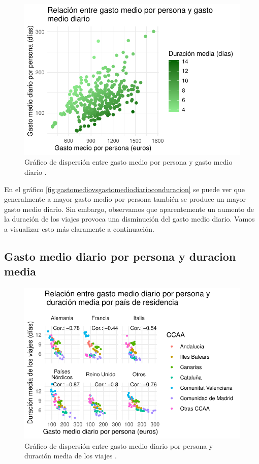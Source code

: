 \documentclass[data,article,submit,moreauthors,pdftex]{Definitions/mdpi}
\begin{document}
\begin{figure}[H]
\includegraphics{ProyectoAED2024_Rmd_files/figure-latex/unnamed-chunk-34-1} \caption{Gráfico de dispersión entre gasto medio por persona y gasto medio diario .\label{fig:gastomediovsgastomediodiarioconduracion}}\label{fig:unnamed-chunk-34}
\end{figure}

En el gráfico \ref{fig:gastomediovsgastomediodiarioconduracion} se puede
ver que generalmente a mayor gasto medio por persona también se produce
un mayor gasto medio diario. Sin embargo, observamos que aparentemente
un aumento de la duración de los viajes provoca una disminución del
gasto medio diario. Vamos a visualizar esto más claramente a
continuación.

\hypertarget{gasto-medio-diario-por-persona-y-duracion-media}{%
\subsection{Gasto medio diario por persona y duracion
media}\label{gasto-medio-diario-por-persona-y-duracion-media}}

\begin{figure}[H]
\includegraphics{ProyectoAED2024_Rmd_files/figure-latex/unnamed-chunk-35-1} \caption{Gráfico de dispersión entre gasto medio diario por persona y duración media de los viajes .\label{fig:gastomediodiariovsduracionmedia}}\label{fig:unnamed-chunk-35}
\end{figure}
\end{document}
